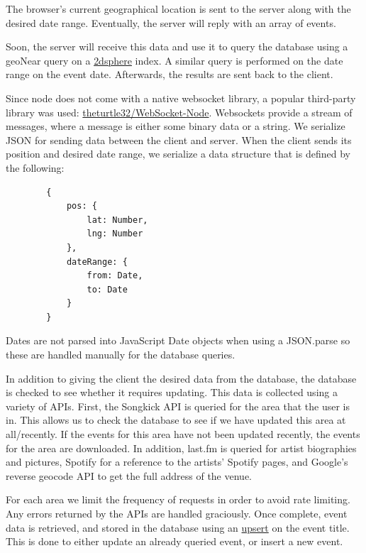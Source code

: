 \documentclass[10pt]{article}
\begin{document}
        The browser's current geographical location is sent to the server along with the desired date range. Eventually, the server will reply with an array of events.

        Soon, the server will receive this data and use it to query the database using a geoNear query on a \href{https://docs.mongodb.com/manual/core/2dsphere/}{2dsphere} index. A similar query is performed on the date range on the event date. Afterwards, the results are sent back to the client.

        Since node does not come with a native websocket library, a popular third-party library was used: \href{https://github.com/theturtle32/WebSocket-Node}{theturtle32/WebSocket-Node}. Websockets provide a stream of messages, where a message is either some binary data or a string. We serialize JSON for sending data between the client and server. When the client sends its position and desired date range, we serialize a data structure that is defined by the following:

        \begin{verbatim}
        {
            pos: {
                lat: Number,
                lng: Number
            },
            dateRange: {
                from: Date,
                to: Date
            }
        }
        \end{verbatim}

        Dates are not parsed into JavaScript Date objects when using a JSON.parse so these are handled manually for the database queries.

        In addition to giving the client the desired data from the database, the database is checked to see whether it requires updating. This data is collected using a variety of APIs. First, the Songkick API is queried for the area that the user is in. This allows us to check the database to see if we have updated this area at all/recently. If the events for this area have not been updated recently, the events for the area are downloaded. In addition, last.fm is queried for artist biographies and pictures, Spotify for a reference to the artists' Spotify pages, and Google's reverse geocode API to get the full address of the venue.

        For each area we limit the frequency of requests in order to avoid rate limiting. Any errors returned by the APIs are handled graciously. Once complete, event data is retrieved, and stored in the database using an \href{https://docs.mongodb.com/manual/reference/method/db.collection.update/#upsert-option}{upsert} on the event title. This is done to either update an already queried event, or insert a new event.
\end{document}
